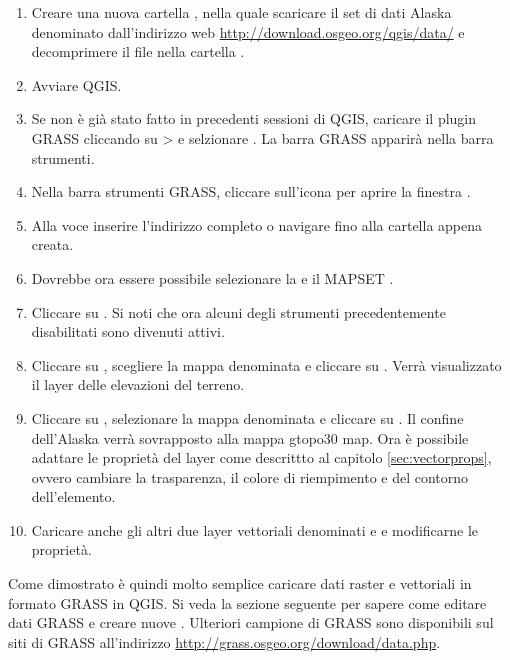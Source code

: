 \begin{enumerate}
  \item Creare una nuova cartella , nella quale scaricare
  il set di dati Alaska denominato 
  dall'indirizzo web \url{http://download.osgeo.org/qgis/data/} e decomprimere
  il file nella cartella . 
  \item Avviare QGIS.
  \item Se non è già stato fatto in precedenti sessioni di QGIS, caricare il
  plugin GRASS cliccando su >  e selzionare . La barra GRASS apparirà nella
  barra strumenti.
  \item Nella barra strumenti GRASS, cliccare sull'icona
   per aprire la finestra
  .
  \item Alla voce  inserire l'indirizzo completo o navigare
  fino alla cartella  appena creata.
  \item Dovrebbe ora essere possibile selezionare la  e il MAPSET . 
  \item Cliccare su . Si noti che ora alcuni degli strumenti
  precedentemente disabilitati sono divenuti attivi.
  \item Cliccare su ,
  scegliere la mappa denominata  e cliccare su .
  Verrà visualizzato il layer delle elevazioni del terreno.
  \item Cliccare su ,
  selezionare la mappa denominata  e cliccare su .
  Il confine dell'Alaska verrà sovrapposto alla mappa gtopo30 map. Ora è
  possibile adattare le proprietà del layer come descrittto al capitolo
  \ref{sec:vectorprops}, ovvero cambiare la trasparenza, il colore di
  riempimento e del contorno dell'elemento.
  \item Caricare anche gli altri due layer vettoriali denominati
   e  e modificarne le proprietà.
\end{enumerate}

Come dimostrato è quindi molto semplice caricare dati raster e vettoriali in
formato GRASS in QGIS. Si veda la sezione seguente per sapere come editare
dati GRASS e creare nuove . Ulteriori 
campione di GRASS sono disponibili sul siti di GRASS all'indirizzo
\url{http://grass.osgeo.org/download/data.php}.

